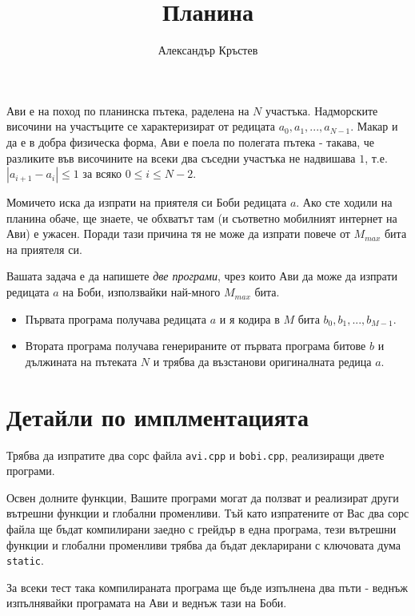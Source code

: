 \documentclass[a4paper,11pt]{article}
\title{Планина}
\author{Александър Кръстев}
\date{}
\newcommand{\code}[1]{\texttt{#1}}
\newcommand{\noskip}{\vspace{-\parskip}}
\begin{document}
{%
    \centering \LARGE 
    \textbf{\@title}
    \par
}

Ави е на поход по планинска пътека, раделена на $N$ участъка.
Надморските височини на участъците се характеризират от редицата 
$a_0, a_1, ..., a_{N-1}$.
Макар и да е в добра физическа форма, Ави е поела по полегата пътека - 
такава, че разликите във височините на всеки два съседни участъка не надвишава
$1$, т.е. $|a_{i+1} - a_i| \leq 1$ за всяко $0 \leq i \leq N-2$.

Момичето иска да изпрати на приятеля си Боби редицата $a$.
Ако сте ходили на планина обаче, ще знаете, че обхватът там (и съответно
мобилният интернет на Ави) е ужасен. 
Поради тази причина тя не може да изпрати повече от $M_{max}$ бита на приятеля
си.

Вашата задача е да напишете \textit{две програми}, чрез които Ави да може да
изпрати редицата $a$ на Боби, използвайки най-много $M_{max}$ бита.
\begin{itemize}
    \item Първата програма получава редицата $a$ и я кодира в $M$ бита
        $b_0, b_1, ..., b_{M-1}$.
    \item Втората програма получава генерираните от първата програма битове $b$
        и дължината на пътеката $N$ и трябва да възстанови оригиналната редица
        $a$.
\end{itemize}

\section*{Детайли по имплментацията}
Трябва да изпратите два сорс файла \code{avi.cpp} и \code{bobi.cpp}, реализиращи
двете програми.

Освен долните функции, Вашите програми могат да ползват и реализират други
вътрешни функции и глобални променливи.
Тъй като изпратените от Вас два сорс файла ще бъдат компилирани заедно с грейдър
в една програма, тези вътрешни функции и глобални променливи трябва да бъдат
декларирани с ключовата дума \code{static}. 

За всеки тест така компилираната програма ще бъде изпълнена два пъти - веднъж
изпълнявайки програмата на Ави и веднъж тази на Боби.
\noskip
\end{document}
